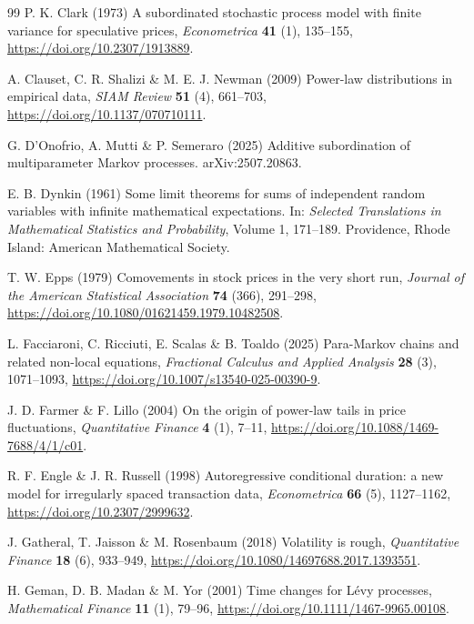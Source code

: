 \documentclass{ws-ijtaf}
\begin{document}
\begin{thebibliography}{99}
 P. K. Clark (1973) A subordinated stochastic
process model with finite variance for speculative prices, {\it Econometrica}
{\bf 41} (1), 135--155, \url{https://doi.org/10.2307/1913889}.

 A. Clauset, C. R. Shalizi \&
M. E. J. Newman (2009) Power-law distributions in empirical data, {\it SIAM
Review} {\bf 51} (4), 661--703, \url{https://doi.org/10.1137/070710111}.

 G. D'Onofrio, A. Mutti \&
P. Semeraro (2025) Additive subordination of multiparameter Markov processes.
arXiv:2507.20863.

 E. B. Dynkin (1961) Some limit theorems for sums
of independent random variables with infinite mathematical expectations. In:
{\it Selected Translations in Mathematical Statistics and Probability},
Volume 1, 171--189. Providence, Rhode Island: American Mathematical Society.

 T. W. Epps (1979) Comovements in stock prices in
the very short run, {\it Journal of the American Statistical Association}
{\bf 74} (366), 291--298,
\url{https://doi.org/10.1080/01621459.1979.10482508}.

 L. Facciaroni, C. Ricciuti,
E. Scalas \& B. Toaldo (2025) Para-Markov chains and related non-local
equations, {\it Fractional Calculus and Applied Analysis} {\bf 28} (3),
1071--1093, \url{https://doi.org/10.1007/s13540-025-00390-9}.

 J. D. Farmer \& F. Lillo (2004) On the
origin of power-law tails in price fluctuations, {\it Quantitative Finance}
{\bf 4} (1), 7--11, \url{https://doi.org/10.1088/1469-7688/4/1/c01}.

 R. F. Engle \& J. R. Russell (1998)
Autoregressive conditional duration: a new model for irregularly spaced
transaction data, {\it Econometrica} {\bf 66} (5), 1127--1162,
\url{https://doi.org/10.2307/2999632}.

 J. Gatheral, T. Jaisson \&
M. Rosenbaum (2018) Volatility is rough, {\it Quantitative Finance} {\bf 18}
(6), 933--949, \url{https://doi.org/10.1080/14697688.2017.1393551}.

 H. Geman, D. B. Madan \& M. Yor
(2001) Time changes for Lévy processes, {\it Mathematical Finance} {\bf 11}
(1), 79--96, \url{https://doi.org/10.1111/1467-9965.00108}.


\end{thebibliography}
\end{document}
